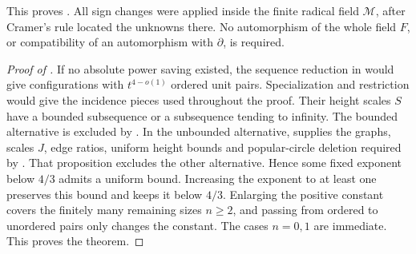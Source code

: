 This proves . All sign changes were applied
inside the finite radical field \(\mathcal M\), after Cramer's rule
located the unknowns there. No automorphism of the whole field
\(F\), or compatibility of an automorphism with \(\partial\), is
required.

\begin{proof}[Proof of ]
If no absolute power saving existed, the sequence reduction in
 would give configurations with
\(t^{4-o(1)}\) ordered unit pairs. Specialization and restriction
would give the incidence pieces used throughout the proof. Their
height scales \(S\) have a bounded subsequence or a subsequence
tending to infinity. The bounded alternative is excluded by
. In the unbounded alternative,
 supplies the graphs, scales \(J\), edge ratios,
uniform height bounds and popular-circle deletion required by
. That proposition excludes the other
alternative. Hence some fixed exponent below \(4/3\) admits a
uniform bound. Increasing the exponent to at least one preserves this
bound and keeps it below \(4/3\). Enlarging the positive constant covers
the finitely many remaining sizes \(n\ge2\), and passing from ordered to
unordered pairs only changes the constant. The cases \(n=0,1\) are
immediate. This proves the theorem.
\end{proof}
